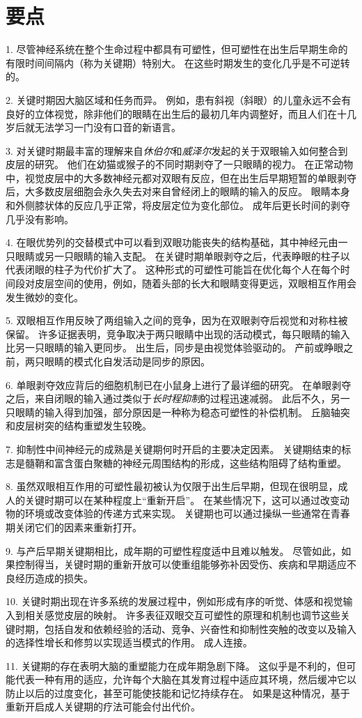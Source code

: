 \section{要点}

1. 尽管神经系统在整个生命过程中都具有可塑性，但可塑性在出生后早期生命的有限时间间隔内（称为关键期）特别大。
在这些时期发生的变化几乎是不可逆转的。


2. 关键时期因大脑区域和任务而异。
例如，患有斜视（斜眼）的儿童永远不会有良好的立体视觉，除非他们的眼睛在出生后的最初几年内调整好，而且人们在十几岁后就无法学习一门没有口音的新语言。


3. 对关键时期最丰富的理解来自\textit{休伯尔}和\textit{威泽尔}发起的关于双眼输入如何整合到皮层的研究。
他们在幼猫或猴子的不同时期剥夺了一只眼睛的视力。
在正常动物中，视觉皮层中的大多数神经元都对双眼有反应，但在出生后早期短暂的单眼剥夺后，大多数皮层细胞会永久失去对来自曾经闭上的眼睛的输入的反应。
眼睛本身和外侧膝状体的反应几乎正常，将皮层定位为变化部位。
成年后更长时间的剥夺几乎没有影响。


4. 在眼优势列的交替模式中可以看到双眼功能丧失的结构基础，其中神经元由一只眼睛或另一只眼睛的输入支配。
在关键时期单眼剥夺之后，代表睁眼的柱子以代表闭眼的柱子为代价扩大了。
这种形式的可塑性可能旨在优化每个人在每个时间段对皮层空间的使用，例如，随着头部的长大和眼睛变得更远，双眼相互作用会发生微妙的变化。


5. 双眼相互作用反映了两组输入之间的竞争，因为在双眼剥夺后视觉和对称柱被保留。
许多证据表明，竞争取决于两只眼睛中出现的活动模式，每只眼睛的输入比另一只眼睛的输入更同步。
出生后，同步是由视觉体验驱动的。
产前或睁眼之前，两只眼睛的模式化自发活动是同步的原因。


6. 单眼剥夺效应背后的细胞机制已在小鼠身上进行了最详细的研究。
在单眼剥夺之后，来自闭眼的输入通过类似于\textit{长时程抑制}的过程迅速减弱。
此后不久，另一只眼睛的输入得到加强，部分原因是一种称为稳态可塑性的补偿机制。
丘脑轴突和皮层树突的结构重塑发生较晚。


7. 抑制性中间神经元的成熟是关键期何时开启的主要决定因素。
关键期结束的标志是髓鞘和富含蛋白聚糖的神经元周围结构的形成，这些结构阻碍了结构重塑。


8. 虽然双眼相互作用的可塑性最初被认为仅限于出生后早期，但现在很明显，成人的关键时期可以在某种程度上“重新开启”。
在某些情况下，这可以通过改变动物的环境或改变体验的传递方式来实现。
关键期也可以通过操纵一些通常在青春期关闭它们的因素来重新打开。


9. 与产后早期关键期相比，成年期的可塑性程度适中且难以触发。
尽管如此，如果控制得当，关键时期的重新开放可以使重组能够弥补因受伤、疾病和早期适应不良经历造成的损失。


10. 关键时期出现在许多系统的发展过程中，例如形成有序的听觉、体感和视觉输入到相关感觉皮层的映射。
许多表征双眼交互可塑性的原理和机制也调节这些关键时期，包括自发和依赖经验的活动、竞争、兴奋性和抑制性突触的改变以及输入的选择性增长和修剪以实现适当模式的作用。 成人连接。


11. 关键期的存在表明大脑的重塑能力在成年期急剧下降。
这似乎是不利的，但可能代表一种有用的适应，允许每个大脑在其发育过程中适应其环境，然后缓冲它以防止以后的过度变化，甚至可能使技能和记忆持续存在。
如果是这种情况，基于重新开启成人关键期的疗法可能会付出代价。



